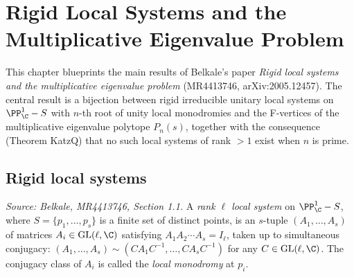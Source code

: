 \chapter{Rigid Local Systems and the Multiplicative Eigenvalue Problem}
\label{chap:overview}


This chapter blueprints the main results of Belkale's paper \emph{Rigid local systems and the multiplicative eigenvalue problem} (MR4413746, arXiv:2005.12457). The central result is a bijection between rigid irreducible unitary local systems on \(\PP^1_\C - S\) with \(n\)-th root of unity local monodromies and the F-vertices of the multiplicative eigenvalue polytope \(P_n(s)\), together with the consequence (Theorem KatzQ) that no such local systems of rank \(>1\) exist when \(n\) is prime.


\section{Rigid local systems}

\begin{definition}[LocalSystem]
  \label{def:local-system}
  \uses{}
  \textit{Source: Belkale, MR4413746, Section 1.1.}
  A \emph{rank \(\ell\) local system} on \(\PP^1_\C - S\), where \(S = \{p_1, \ldots, p_s\}\) is a finite set of distinct points, is an \(s\)-tuple \((A_1, \ldots, A_s)\) of matrices \(A_i \in \mathrm{GL}(\ell, \C)\) satisfying \(A_1 A_2 \cdots A_s = I_\ell\), taken up to simultaneous conjugacy: \((A_1, \ldots, A_s) \sim (C A_1 C^{-1}, \ldots, C A_s C^{-1})\) for any \(C \in \mathrm{GL}(\ell, \C)\). The conjugacy class of \(A_i\) is called the \emph{local monodromy} at \(p_i\).
\end{definition}

